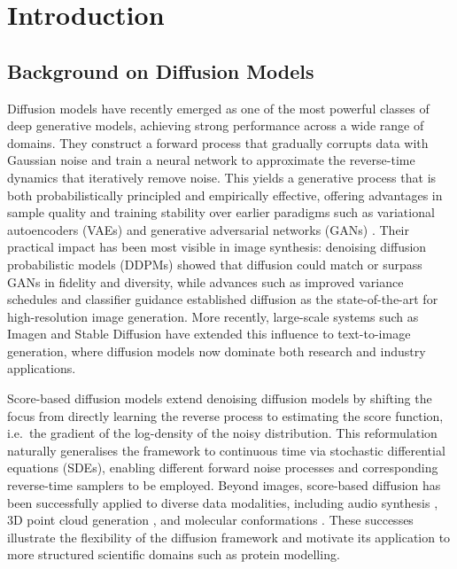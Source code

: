 \documentclass[a4paper,12pt]{article}
\begin{document}
\section{Introduction}
\subsection{Background on Diffusion Models}
Diffusion models have recently emerged as one of the most powerful classes of deep generative models, achieving strong performance across a wide range of domains. They construct a forward process that gradually corrupts data with Gaussian noise and train a neural network to approximate the reverse-time dynamics that iteratively remove noise. This yields a generative process that is both probabilistically principled and empirically effective, offering advantages in sample quality and training stability over earlier paradigms such as variational autoencoders (VAEs) \citep{kingma2022AutoEncodingVariationalBayes} and generative adversarial networks (GANs) \citep{goodfellow2020GenerativeAdversarialNetworks}. Their practical impact has been most visible in image synthesis: denoising diffusion probabilistic models (DDPMs) \citep{hoDenoisingDiffusionProbabilistic2020} showed that diffusion could match or surpass GANs in fidelity and diversity, while advances such as improved variance schedules and classifier guidance \citep{dhariwal2021DiffusionModelsBeat} established diffusion as the state-of-the-art for high-resolution image generation. More recently, large-scale systems such as Imagen \citep{saharia2022PhotorealisticTexttoImageDiffusion} and Stable Diffusion \citep{rombach2022HighResolutionImageSynthesis} have extended this influence to text-to-image generation, where diffusion models now dominate both research and industry applications.

Score-based diffusion models \citep{song2019GenerativeModelingEstimating,songImprovedTechniquesTraining2020,song2021ScoreBasedGenerativeModeling,songMaximumLikelihoodTraining2021} extend denoising diffusion models by shifting the focus from directly learning the reverse process to estimating the score function, i.e.\ the gradient of the log-density of the noisy distribution. This reformulation naturally generalises the framework to continuous time via stochastic differential equations (SDEs), enabling different forward noise processes and corresponding reverse-time samplers to be employed. Beyond images, score-based diffusion has been successfully applied to diverse data modalities, including audio synthesis \citep{kong2021DiffWaveVersatileDiffusion}, 3D point cloud generation \citep{luo2021DiffusionProbabilisticModels}, and molecular conformations \citep{pmlr-v162-hoogeboom22a}. These successes illustrate the flexibility of the diffusion framework and motivate its application to more structured scientific domains such as protein modelling.
\end{document}
